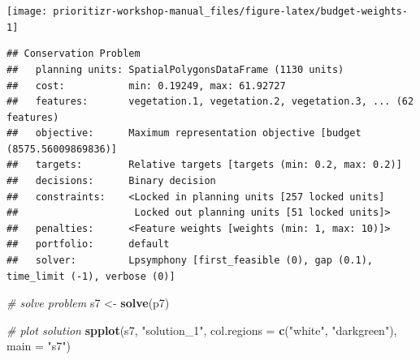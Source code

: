 \documentclass[12pt,]{book}
\newenvironment{Shaded}{\begin{snugshade}}{\end{snugshade}}
\newcommand{\KeywordTok}[1]{\textcolor[rgb]{0.13,0.29,0.53}{\textbf{#1}}}
\newcommand{\DataTypeTok}[1]{\textcolor[rgb]{0.13,0.29,0.53}{#1}}
\newcommand{\FloatTok}[1]{\textcolor[rgb]{0.00,0.00,0.81}{#1}}
\newcommand{\StringTok}[1]{\textcolor[rgb]{0.31,0.60,0.02}{#1}}
\newcommand{\CommentTok}[1]{\textcolor[rgb]{0.56,0.35,0.01}{\textit{#1}}}
\newcommand{\OtherTok}[1]{\textcolor[rgb]{0.56,0.35,0.01}{#1}}
\newcommand{\OperatorTok}[1]{\textcolor[rgb]{0.81,0.36,0.00}{\textbf{#1}}}
\newcommand{\NormalTok}[1]{#1}
\begin{document}
\begin{center}\texttt{[image: prioritizr-workshop-manual\_files/figure-latex/budget-weights-1]} \end{center}

\begin{Shaded}
\end{Shaded}

\begin{verbatim}
## Conservation Problem
##   planning units: SpatialPolygonsDataFrame (1130 units)
##   cost:           min: 0.19249, max: 61.92727
##   features:       vegetation.1, vegetation.2, vegetation.3, ... (62 features)
##   objective:      Maximum representation objective [budget (8575.56009869836)]
##   targets:        Relative targets [targets (min: 0.2, max: 0.2)]
##   decisions:      Binary decision 
##   constraints:    <Locked in planning units [257 locked units]
##                    Locked out planning units [51 locked units]>
##   penalties:      <Feature weights [weights (min: 1, max: 10)]>
##   portfolio:      default
##   solver:         Lpsymphony [first_feasible (0), gap (0.1), time_limit (-1), verbose (0)]
\end{verbatim}

\begin{Shaded}
\begin{Highlighting}[]
\CommentTok{# solve problem}
\NormalTok{s7 <-}\StringTok{ }\KeywordTok{solve}\NormalTok{(p7)}

\CommentTok{# plot solution}
\KeywordTok{spplot}\NormalTok{(s7, }\StringTok{"solution_1"}\NormalTok{, }\DataTypeTok{col.regions =} \KeywordTok{c}\NormalTok{(}\StringTok{"white"}\NormalTok{, }\StringTok{"darkgreen"}\NormalTok{), }\DataTypeTok{main =} \StringTok{"s7"}\NormalTok{)}
\end{Highlighting}
\end{Shaded}
\end{document}
